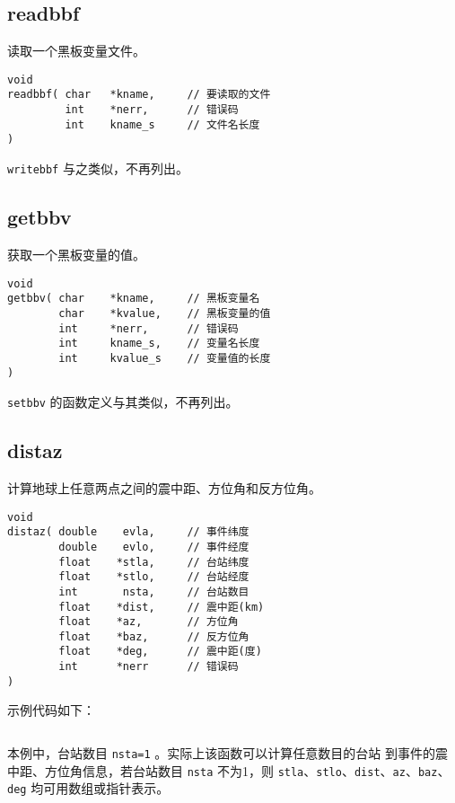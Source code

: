 \subsection{readbbf}
读取一个黑板变量文件。
\begin{verbatim}
void
readbbf( char   *kname,     // 要读取的文件
         int    *nerr,      // 错误码
         int    kname_s     // 文件名长度
)
\end{verbatim}

\texttt{writebbf} 与之类似，不再列出。

\subsection{getbbv}
获取一个黑板变量的值。
\begin{verbatim}
void
getbbv( char    *kname,     // 黑板变量名
        char    *kvalue,    // 黑板变量的值
        int     *nerr,      // 错误码
        int     kname_s,    // 变量名长度
        int     kvalue_s    // 变量值的长度
)
\end{verbatim}
\texttt{setbbv} 的函数定义与其类似，不再列出。

\subsection{distaz}
计算地球上任意两点之间的震中距、方位角和反方位角。
\begin{verbatim}
void
distaz( double    evla,     // 事件纬度
        double    evlo,     // 事件经度
        float    *stla,     // 台站纬度
        float    *stlo,     // 台站经度
        int       nsta,     // 台站数目
        float    *dist,     // 震中距(km)
        float    *az,       // 方位角
        float    *baz,      // 反方位角
        float    *deg,      // 震中距(度)
        int      *nerr      // 错误码
)
\end{verbatim}
示例代码如下：
\inputminted{c}{./libs/distaz.c}
本例中，台站数目 \texttt{nsta=1} 。实际上该函数可以计算任意数目的台站
到事件的震中距、方位角信息，若台站数目 \texttt{nsta} 不为1，则
\texttt{stla}、\texttt{stlo}、\texttt{dist}、\texttt{az}、\texttt{baz}、
\texttt{deg} 均可用数组或指针表示。
